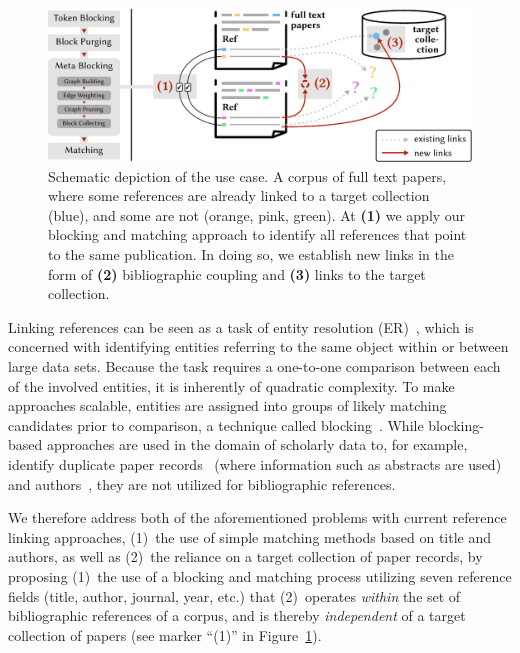 \begin{figure}[tb]
  \centering
  \includegraphics[width=\linewidth]{figures/ref_covgran/approach_withblocking_10pvar.pdf}
  \caption{Schematic depiction of the use case. A corpus of full text papers, where some references are already linked to a target collection (blue), and some are not (orange, pink, green). At \textbf{(1)} we apply our blocking and matching approach to identify all references that point to the same publication. In doing so, we establish new links in the form of \textbf{(2)} bibliographic coupling and \textbf{(3)} links to the target collection.}
  \label{fig:approach}
\end{figure}

Linking references can be seen as a task of entity resolution (ER)~\cite{Christophides2015ERdef}, which is concerned with identifying entities referring to the same object within or between large data sets. Because the task requires a one-to-one comparison between each of the involved entities, it is inherently of quadratic complexity. To make approaches scalable, entities are assigned into groups of likely matching candidates prior to comparison, a technique called blocking~\cite{Papadakis2020survey}.
While blocking-based approaches are used in the domain of scholarly data to, for example, identify duplicate paper records~\cite{Simonini2016blast,Sefid2019,Lo2020} (where information such as abstracts are used) and authors~\cite{FaerberLin2022}, they are not utilized for bibliographic references.

We therefore address both of the aforementioned problems with current reference linking approaches, (1)~the use of simple matching methods based on title and authors, as well as (2)~the reliance on a target collection of paper records, by proposing (1)~the use of a blocking and matching process utilizing seven reference fields (title, author, journal, year, etc.) that (2)~operates \emph{within} the set of bibliographic references of a corpus, and is thereby \emph{independent} of a target collection of papers (see marker ``(1)'' in Figure~\ref{fig:approach}).

